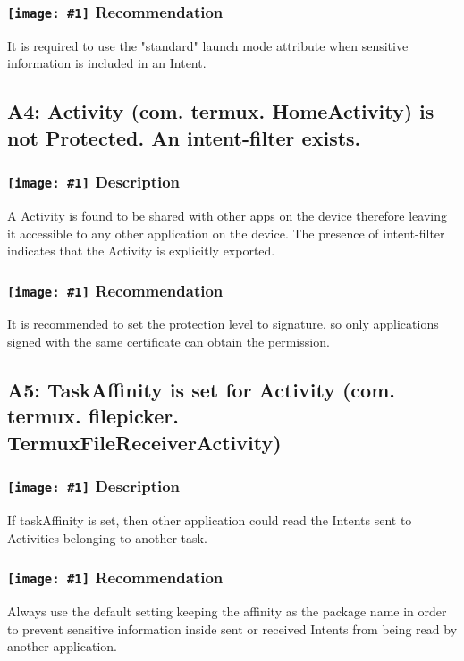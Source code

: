 \documentclass[12p]{article}
\newcommand{\icon}[1]{\texttt{[image: \#1]}}
\begin{document}
\subsubsection*{\protect\icon{/home/miki/Documents/GITHUB/AndroidPermissions/python/vulns/report_icons/basic_todo.png} Recommendation}
It is required to use the "standard" launch mode attribute when sensitive information is included in an Intent.
\subsection{A4: Activity (com. termux. HomeActivity) is not Protected. An intent-filter exists.}
\subsubsection*{\protect\icon{/home/miki/Documents/GITHUB/AndroidPermissions/python/vulns/report_icons/basic_sheet.png} Description}
A  Activity is found to be shared with other apps on the device therefore leaving it accessible to any other application on the device. The presence of intent-filter indicates that the Activity is explicitly exported.
\subsubsection*{\protect\icon{/home/miki/Documents/GITHUB/AndroidPermissions/python/vulns/report_icons/basic_todo.png} Recommendation}
It is recommended to set the protection level to signature, so only applications signed with the same certificate can obtain the permission.
\subsection{A5: TaskAffinity is set for Activity (com. termux. filepicker. TermuxFileReceiverActivity)}
\subsubsection*{\protect\icon{/home/miki/Documents/GITHUB/AndroidPermissions/python/vulns/report_icons/basic_sheet.png} Description}
If taskAffinity is set, then other application could read the Intents sent to Activities belonging to another task.
\subsubsection*{\protect\icon{/home/miki/Documents/GITHUB/AndroidPermissions/python/vulns/report_icons/basic_todo.png} Recommendation}
Always use the default setting keeping the affinity as the package name in order to prevent sensitive information inside sent or received Intents  from being read by another application.
\end{document}
